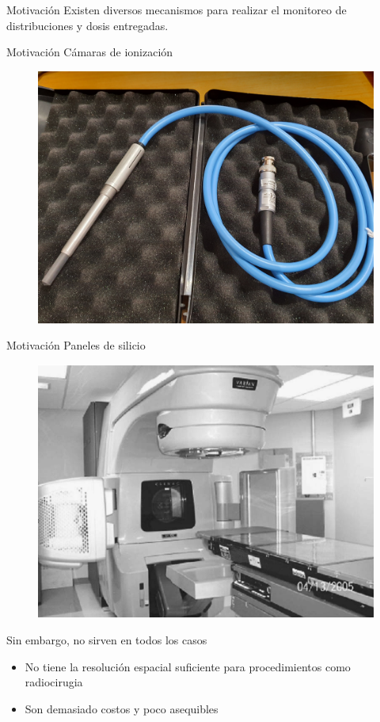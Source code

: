 \documentclass[12pt]{beamer}
\begin{document}
\begin{frame}{Motivación}
	Existen diversos mecanismos para realizar el monitoreo de distribuciones y dosis entregadas.\\
\end{frame}

\begin{frame}{Motivación}
	Cámaras de ionización 
	\begin{figure}
		\centering
		\includegraphics[width=0.7\linewidth]{images/camara.jpg}
	\end{figure}
\end{frame}

\begin{frame}{Motivación}
Paneles de silicio
\begin{figure}
	\centering
	\includegraphics[width=0.7\linewidth]{images/silicio.png}
	\caption{\cite{Yoo2006}}
\end{figure}
\end{frame}

\begin{frame}
	Sin embargo, no sirven en todos los casos
	\begin{itemize}
		\item No tiene la resolución espacial suficiente para procedimientos como radiocirugia
		\item Son demasiado costos y poco asequibles 
	\end{itemize}
\end{frame}
\end{document}
